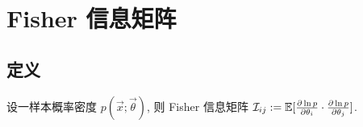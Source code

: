 \chapter{Fisher 信息矩阵}\label{Fisher_matrix}

\section{定义}

设一样本概率密度 $p(\vec{x};\vec{\theta})$, 则 Fisher 信息矩阵 $\mathcal{I}_{ij}:=\mathbb{E}[\frac{\partial\ln p}{\partial \theta_i}\cdot\frac{\partial\ln p}{\partial \theta_j}]$.
